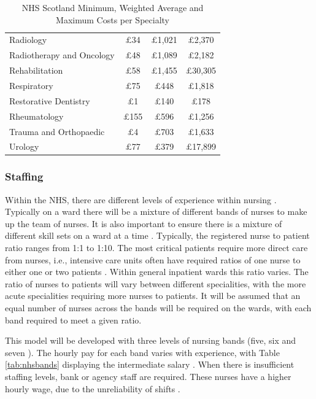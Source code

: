 \documentclass[../thesis.tex]{subfiles}
\begin{document}
\begin{table}[h!]
\begin{tabular}{lccc}
        Radiology & $\pounds$34 & $\pounds$1,021 & $\pounds$2,370\\
        Radiotherapy and Oncology & $\pounds$48 & $\pounds$1,089 & $\pounds$2,182 \\ 
        Rehabilitation & $\pounds$58 & $\pounds$1,455 & $\pounds$30,305 \\
        Respiratory & $\pounds$75 & $\pounds$448 & $\pounds$1,818 \\
        Restorative Dentistry & $\pounds$1 & $\pounds$140 & $\pounds$178 \\
        Rheumatology & $\pounds$155 & $\pounds$596 & $\pounds$1,256 \\
        Trauma and Orthopaedic & $\pounds$4 & $\pounds$703 & $\pounds$1,633 \\
        Urology & $\pounds$77 & $\pounds$379 & $\pounds$17,899 \\ \bottomrule
    \end{tabular}
    \caption{NHS Scotland Minimum, Weighted Average and Maximum Costs per Specialty \cite{PHS2021}}
    \label{tab:PHSCostsPerSpecialty}
\end{table}


\subsubsection{Staffing}\label{sec:ABUHBstaffing}
Within the NHS, there are different levels of experience within nursing \cite{NHS2022}. Typically on a ward there will be a mixture of different bands of nurses to make up the team of nurses. It is also important to ensure there is a mixture of different skill sets on a ward at a time \cite{Jones2015}. Typically, the registered nurse to patient ratio ranges from 1:1 to 1:10. The most critical patients require more direct care from nurses, i.e., intensive care units often have required ratios of one nurse to either one or two patients \cite{Kean2013}. Within general inpatient wards this ratio varies. The ratio of nurses to patients will vary between different specialities, with the more acute specialities requiring more nurses to patients. It will be assumed that an equal number of nurses across the bands will be required on the wards, with each band required to meet a given ratio.

This model will be developed with three levels of nursing bands (five, six and seven \cite{East2014}). The hourly pay for each band varies with experience, with Table \ref{tab:nhsbands} displaying the intermediate salary \cite{NHSEmployers2021}. When there is insufficient staffing levels, bank or agency staff are required. These nurses 
have a higher hourly wage, due to the unreliability of shifts \cite{OHNFT2023}. 
\end{document}
